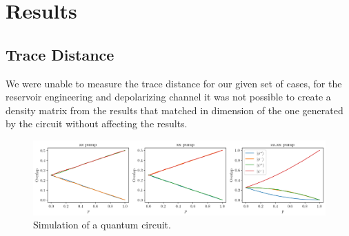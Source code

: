 \documentclass[12pt]{article}
\begin{document}
  \section{Results}
  \subsection{Trace Distance}
        We were unable to measure the trace distance for our given set of cases, for the reservoir engineering and depolarizing channel it was not possible to create a density matrix from the results that matched in dimension of the one generated by the circuit without affecting the results.

  \begin{figure}
    \centering
    \includegraphics[width=\textwidth]{images/reservoir-engineering-simulation}
    \caption{Simulation of a quantum circuit.%
      \label{fig:reservoir-engineering-simulation}}
  \end{figure}

  \printbibliography
\end{document}
